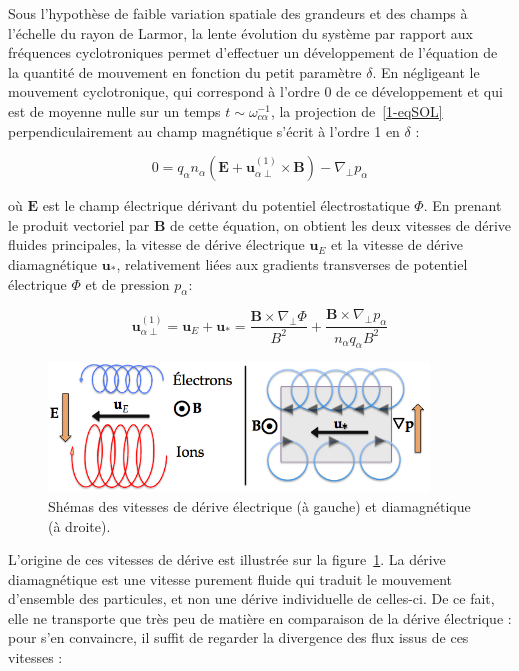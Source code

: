\begin{refsection}
 Sous l'hypothèse de faible variation spatiale des grandeurs et des champs à
 l'échelle du rayon de Larmor, la lente évolution du système par rapport aux
 fréquences cyclotroniques permet d'effectuer un développement de l'équation de
 la quantité de mouvement en fonction du petit paramètre $\delta$. En négligeant
 le mouvement cyclotronique, qui correspond à l'ordre 0 de ce développement et qui
 est de moyenne nulle sur un temps $t\sim\omega_{c\alpha}^{-1}$, la projection
 de~\eqref{1-eqSOL} perpendiculairement au champ magnétique s'écrit à l'ordre 1
 en $\delta$ :
 
 \begin{equation}
\label{1-eqSOLperp}
0
={q_\alpha n_\alpha}\left(\mathbf E+\mathbf
u_{\alpha\perp}^{(1)}\times \mathbf B\right)
-{\nabla_\perp p_\alpha}
\end{equation}

où $\mathbf E$ est le champ électrique dérivant du potentiel électrostatique
$\Phi$. En prenant le produit vectoriel par $\mathbf B$ de cette équation, on
obtient les deux vitesses de dérive fluides principales, la vitesse de dérive
électrique $\mathbf u_E$ et la vitesse de dérive diamagnétique $\mathbf u_*$,
relativement liées aux gradients transverses de potentiel électrique $\Phi$ et
de pression $p_\alpha$:

\begin{equation}
\label{1-eqVitessesDerive}
\mathbf u_{\alpha\perp}^{(1)}=\mathbf u_E+\mathbf u_*=\frac{\mathbf
B\times\nabla_\perp \Phi}{B^2}+\frac{\mathbf B\times\nabla_\perp
p_\alpha}{n_\alpha q_\alpha B^2}
\end{equation}

\begin{figure}[!htbp]
    \centering
	\includegraphics[width=0.9\textwidth]{figures/1-vitessesDerive.png}
	\caption{Shémas des vitesses de dérive électrique (à gauche) et diamagnétique
	(à droite).}
	\label{1-vitessesDerive}
\end{figure}

L'origine de ces vitesses de dérive est illustrée sur la
figure~\ref{1-vitessesDerive}. La dérive diamagnétique est une vitesse
purement fluide qui traduit le mouvement d'ensemble des particules, et non
une dérive individuelle de celles-ci. De ce fait, elle ne transporte que
très peu de matière en comparaison de la dérive électrique : pour s'en
convaincre, il suffit de regarder la divergence des flux issus de ces
vitesses :


\end{refsection}
